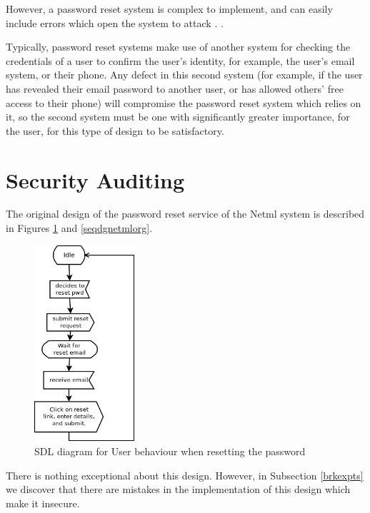 However, a password reset system is
complex to implement, and can easily include errors which open the system to attack
\iflonger
\cite{routh2018attacks,florencio2014administrator}. 
\else
\cite{routh2018attacks}. 
\fi

Typically, password reset systems make use of another system for checking
the credentials of a user to confirm the user's identity, for example,
the user's email system, or their phone. Any defect
in this second system (for example, if the user has revealed their email password
to another user, or has allowed others' free access to their phone) will compromise the password reset system
which relies on it, so the second system must be one with significantly
greater importance, for the user, for this type of design to be
satisfactory.\\

\section{Security Auditing}\label{secadit}

The original design of the password reset
service of the Netml system is described in Figures \ref{usersdl} and
\ref{seqdgnetmlorg}.
\begin{figure}
\begin{center}
\vspace{5mm}
\includegraphics[width=37mm]{figures/resetpwd.png}
\caption{SDL diagram for User behaviour when resetting the password}
\label{usersdl}
\end{center}
\end{figure}

There is nothing exceptional about this design. However, in Subsection \ref{brkexpts}
we discover that there are mistakes in the implementation of this design which
make it insecure.

